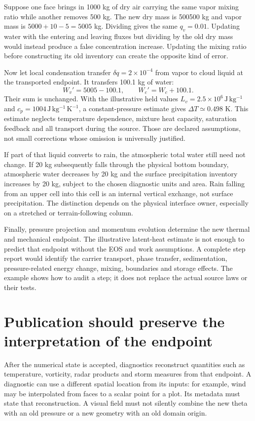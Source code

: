 Suppose one face brings in 1000 kg of dry air carrying the same vapor mixing
ratio while another removes 500 kg. The new dry mass is 500500 kg and vapor
mass is $5000+10-5=5005$ kg. Dividing gives the same $q_v=0.01$. Updating water
with the entering and leaving fluxes but dividing by the old dry mass would
instead produce a false concentration increase. Updating the mixing ratio
before constructing its old inventory can create the opposite kind of error.

Now let local condensation transfer $\delta q=2\times10^{-4}$ from vapor to
cloud liquid at the transported endpoint. It transfers 100.1 kg of water:
\[
 W_v'=5005-100.1,\qquad W_c'=W_c+100.1.
\]
Their sum is unchanged. With the illustrative held values
$L_v=2.5\times10^6\,\mathrm{J\,kg^{-1}}$ and
$c_p=1004\,\mathrm{J\,kg^{-1}\,K^{-1}}$, a constant-pressure estimate gives
$\Delta T\simeq0.498$ K. This estimate neglects temperature dependence,
mixture heat capacity, saturation feedback and all transport during the source.
Those are declared assumptions, not small corrections whose omission is
universally justified.

If part of that liquid converts to rain, the atmospheric total water still
need not change. If 20 kg subsequently falls through the physical bottom
boundary, atmospheric water decreases by 20 kg and the surface precipitation
inventory increases by 20 kg, subject to the chosen diagnostic units and area.
Rain falling from an upper cell into this cell is an internal vertical exchange,
not surface precipitation. The distinction depends on the physical interface
owner, especially on a stretched or terrain-following column.

Finally, pressure projection and momentum evolution determine the new thermal
and mechanical endpoint. The illustrative latent-heat estimate is not enough
to predict that endpoint without the EOS and work assumptions. A complete
step report would identify the carrier transport, phase transfer, sedimentation,
pressure-related energy change, mixing, boundaries and storage effects. The
example shows how to audit a step; it does not replace the actual source laws
or their tests.

\section{Publication should preserve the interpretation of the endpoint}

After the numerical state is accepted, diagnostics reconstruct quantities such
as temperature, vorticity, radar products and storm measures from that endpoint.
A diagnostic can use a different spatial location from its inputs: for example,
wind may be interpolated from faces to a scalar point for a plot. Its metadata
must state that reconstruction. A visual field must not silently combine the
new theta with an old pressure or a new geometry with an old domain origin.

